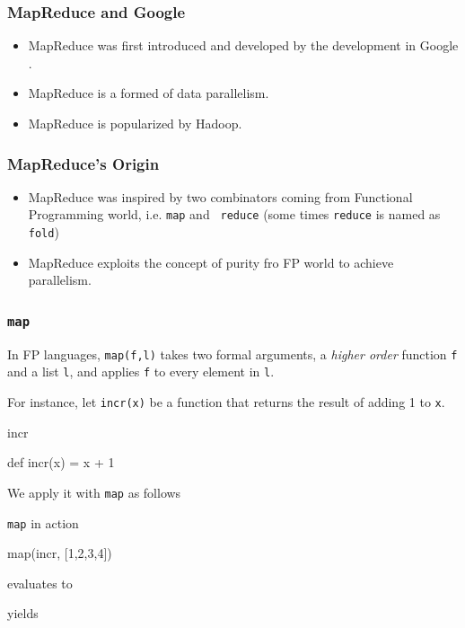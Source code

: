\documentclass{beamer}
\newcommand{\beb}{\begin{exampleblock}}
\newcommand{\eeb}{\end{exampleblock}}
\begin{document}
\begin{frame}[fragile]
\frametitle{MapReduce and Google}

\begin{itemize}
 \item MapReduce was first introduced and developed by the development
   in Google \cite{Dean:2008:MSD:1327452.1327492}.
 \item MapReduce is a formed of data parallelism.
 \item MapReduce is popularized by Hadoop.
\end{itemize}
\end{frame}

\begin{frame}[fragile]
\frametitle{MapReduce's Origin}

\begin{itemize}
 \item MapReduce was inspired by two combinators coming from
   Functional Programming world, i.e. {\tt map} and {\tt
     reduce} (some times {\tt reduce} is named as {\tt fold})
 \item MapReduce exploits the concept of purity fro FP world to
   achieve parallelism.
\end{itemize}
\end{frame}


\begin{frame}[fragile]
\frametitle{{\tt map}}

In FP languages, {\tt map(f,l)} takes two formal arguments, a {\em
  higher order} function {\tt f} and a list {\tt l}, and applies {\tt f} to every element
in {\tt l}. 

For instance, let {\tt incr(x)} be a function that returns the result
of adding 1 to {\tt x}. 
\beb{incr}
\begin{code}
def incr(x) = x + 1
\end{code}
\eeb
We apply it with {\tt map} as follows
\beb{{\tt map} in action}
\begin{code}
map(incr, [1,2,3,4])
\end{code}
\eeb
evaluates to 
\beb{}
\begin{code}
\end{code}
\eeb
yields
\beb{}
\begin{code}
[2,3,4,5]
\end{code}
\eeb
\end{frame}
\end{document}
